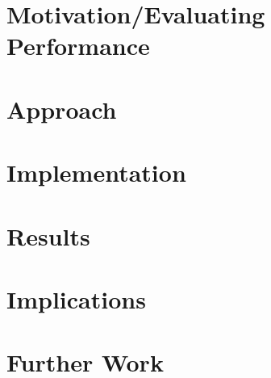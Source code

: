 \documentclass[10pt,letterpaper]{report}
\begin{document}
\section{Motivation/Evaluating Performance}

\section{Approach}

\section{Implementation}

\section{Results}

\section{Implications}

\section{Further Work}
\end{document}
